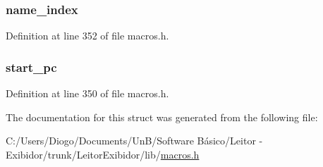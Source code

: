 \subsubsection[{name\+\_\+index}]{ name\+\_\+index}\label{struct_local__variable__table_ae939ac3ca00f5727beaa02d0e339183d}


Definition at line 352 of file macros.\+h.

\hypertarget{struct_local__variable__table_a3ded0b47a89e0816c20dc577a82a1cd5}{}
\subsubsection[{start\+\_\+pc}]{ start\+\_\+pc}\label{struct_local__variable__table_a3ded0b47a89e0816c20dc577a82a1cd5}


Definition at line 350 of file macros.\+h.



The documentation for this struct was generated from the following file\+:\begin{DoxyCompactItemize}
\item 
C\+:/\+Users/\+Diogo/\+Documents/\+Un\+B/\+Software Básico/\+Leitor -\/ Exibidor/trunk/\+Leitor\+Exibidor/lib/\hyperlink{macros_8h}{macros.\+h}\end{DoxyCompactItemize}
